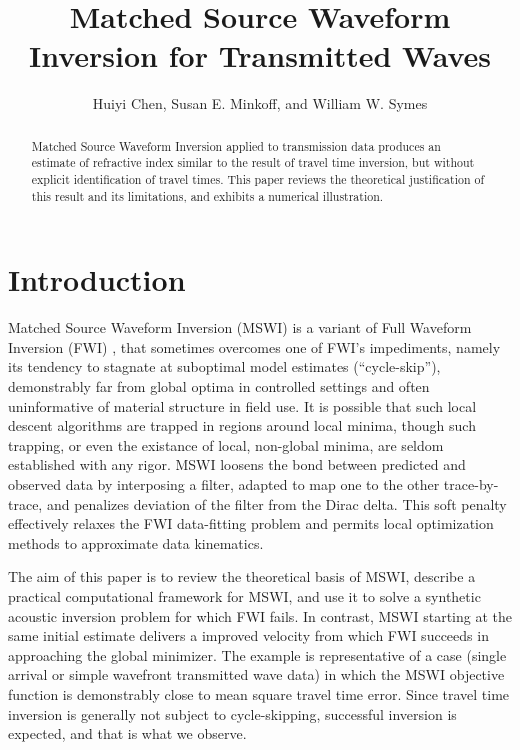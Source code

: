 \title{Matched Source Waveform Inversion for Transmitted Waves}
\author{Huiyi Chen, Susan E. Minkoff, and William W. Symes}



\maketitle
\parskip 12pt

\begin{abstract}
Matched Source Waveform Inversion applied to transmission data
produces an estimate of refractive index similar to the result of
travel time inversion, but without explicit identification of travel
times. This paper reviews the theoretical justification of this result
and its limitations, and exhibits a numerical illustration. 
\end{abstract}
\setlength{\parindent}{0cm}

\section{Introduction}
Matched Source Waveform Inversion (MSWI) is a variant of Full Waveform
Inversion (FWI) \cite[]{VirieuxOperto:09}, that sometimes overcomes
one of FWI's impediments, namely its tendency to stagnate at
suboptimal model estimates (``cycle-skip''), demonstrably far from global optima in
controlled settings and often uninformative of material structure in
field use. It is possible that such local descent algorithms are
trapped in regions around local minima, though such trapping, or even
the existance of local, non-global minima, are seldom established with
any rigor. MSWI
loosens the bond between predicted and observed data by interposing a
filter, adapted to map one to the other trace-by-trace, and penalizes
deviation of the filter from the Dirac delta. This soft penalty
effectively relaxes the FWI data-fitting problem and permits local
optimization methods to approximate data kinematics.

The aim of this paper is to review the theoretical basis of MSWI,
describe a practical computational framework for MSWI, and use it to
solve a synthetic acoustic inversion problem for which FWI fails. In
contrast, MSWI starting at the same initial estimate delivers a
improved velocity from which FWI succeeds in approaching the global
minimizer. The example is representative of a case (single arrival or
simple wavefront transmitted wave data) in which the MSWI objective
function is demonstrably close to mean square travel time error. Since
travel time inversion is generally not subject to cycle-skipping,
successful inversion is expected, and that is what we observe.

